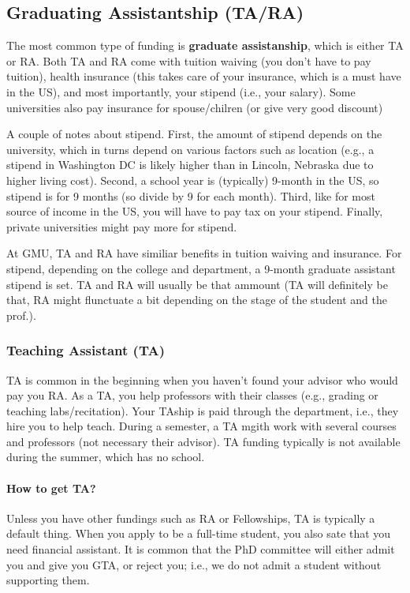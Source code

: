 \documentclass[10pt]{article}
\begin{document}
\subsection{Graduating Assistantship (TA/RA)}
The most common type of funding is \textbf{graduate assistanship}, which is either TA or RA. Both TA and RA come with tuition waiving (you don't have to pay tuition), health insurance (this takes care of your insurance, which is a must have in the US), and most importantly, your stipend (i.e., your salary). Some universities also pay insurance for spouse/chilren (or give very good discount)

A couple of notes about stipend. First, the amount of stipend depends on the university, which in turns depend on various factors such as location (e.g., a stipend in Washington DC is likely higher than in Lincoln, Nebraska due to higher living cost). Second, a school year is (typically) 9-month in the US, so stipend is for 9 months (so divide by 9 for each month). Third, like for most source of income in the US, you will have to pay tax on your stipend. Finally, private universities might pay more for stipend.

\begin{tcolorbox}[left=1pt,right=1pt,top=1pt,bottom=1pt]
At GMU, TA and RA have similiar benefits in tuition waiving and insurance.  For stipend, depending on the college and department, a 9-month graduate assistant stipend is set.  TA and RA will usually be that ammount (TA will definitely be that, RA might flunctuate a bit depending on the stage of the student and the prof.). 
\end{tcolorbox}

\subsubsection{Teaching Assistant (TA)}

TA is common in the beginning when you haven't found your advisor who would pay you RA. As a TA, you help professors with their classes (e.g., grading or teaching labs/recitation). Your TAship is paid through the department, i.e., they hire you to help teach.  During a semester, a TA mgith work with several courses and professors (not necessary their advisor).  TA funding typically is not available during the summer, which has no school.

\paragraph{How to get TA?}  Unless you have other fundings such as RA or Fellowships, TA is typically a default thing. When you apply to be a full-time student, you also sate that you need financial assistant. It is common that the PhD committee will either admit you and give you GTA, or reject you; i.e., we do not admit a student without supporting them.  
\end{document}
